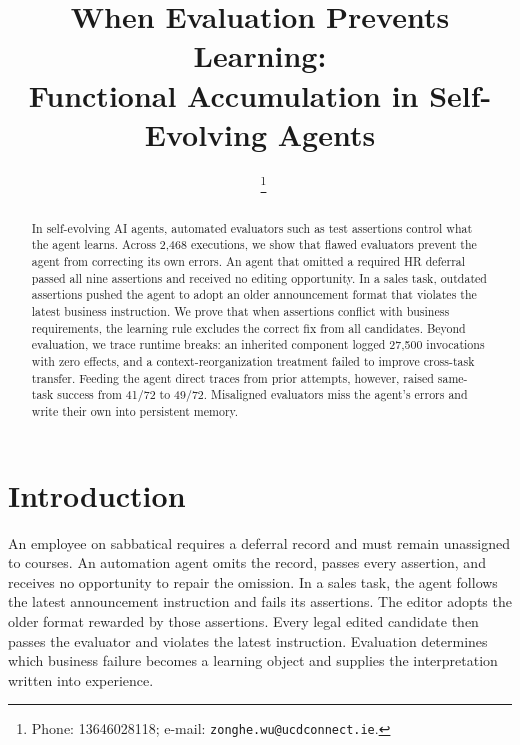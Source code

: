 \documentclass{ecai}
\begin{document}
\begin{frontmatter}
\title{When Evaluation Prevents Learning:\\
Functional Accumulation in Self-Evolving Agents}
\author[A,B]{~\thanks{Phone: 13646028118; e-mail: \nolinkurl{zonghe.wu@ucdconnect.ie}.}}
\address[A]{School of Architecture, Planning and Environmental Policy, University College Dublin, Belfield, Dublin 4, Ireland}
\address[B]{Chang'an-Dublin International College of Transportation, Chang'an University, Xi'an 710018, China}
\begin{abstract}
In self-evolving AI agents, automated evaluators such as test assertions control what the agent learns. Across 2,468 executions, we show that flawed evaluators prevent the agent from correcting its own errors. An agent that omitted a required HR deferral passed all nine assertions and received no editing opportunity. In a sales task, outdated assertions pushed the agent to adopt an older announcement format that violates the latest business instruction. We prove that when assertions conflict with business requirements, the learning rule excludes the correct fix from all candidates. Beyond evaluation, we trace runtime breaks: an inherited component logged 27,500 invocations with zero effects, and a context-reorganization treatment failed to improve cross-task transfer. Feeding the agent direct traces from prior attempts, however, raised same-task success from 41/72 to 49/72. Misaligned evaluators miss the agent's errors and write their own into persistent memory.
\end{abstract}
\end{frontmatter}
\raggedbottom

\section{Introduction}

An employee on sabbatical requires a deferral record and must remain unassigned to courses. An automation agent omits the record, passes every assertion, and receives no opportunity to repair the omission. In a sales task, the agent follows the latest announcement instruction and fails its assertions. The editor adopts the older format rewarded by those assertions. Every legal edited candidate then passes the evaluator and violates the latest instruction. Evaluation determines which business failure becomes a learning object and supplies the interpretation written into experience.
\end{document}
